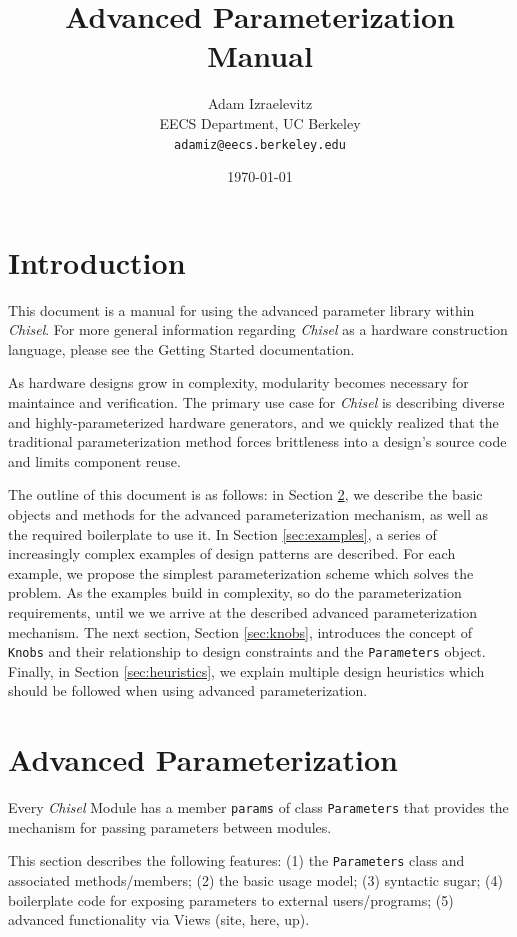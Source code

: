 \documentclass[10pt,twocolumn]{article}
\title{Advanced Parameterization Manual}
\author{Adam Izraelevitz \\
EECS Department, UC Berkeley\\
{\tt  adamiz@eecs.berkeley.edu}
}
\date{\today}
\def\code#1{{\small\tt #1}}
\begin{document}
\maketitle{}


\section{Introduction}

This document is a manual for using the advanced parameter library within {\em Chisel}. For more general information regarding {\em Chisel} as a hardware construction language, please see the Getting Started documentation.

As hardware designs grow in complexity, modularity becomes necessary for maintaince and verification. The primary use case for {\em Chisel} is describing diverse and highly-parameterized hardware generators, and we quickly realized that the traditional parameterization method forces brittleness into a design's source code and limits component reuse.

The outline of this document is as follows: in Section \ref{sec:advanced}, we describe the basic objects and methods for the advanced parameterization mechanism, as well as the required boilerplate to use it. In Section \ref{sec:examples}, a series of increasingly complex examples of design patterns are described. For each example, we propose the simplest parameterization scheme which solves the problem. As the examples build in complexity, so do the parameterization requirements, until we we arrive at the described advanced parameterization mechanism. The next section, Section \ref{sec:knobs}, introduces the concept of \code{Knobs} and their relationship to design constraints and the \code{Parameters} object. Finally, in Section \ref{sec:heuristics}, we explain multiple design heuristics which should be followed when using advanced parameterization.

\section{Advanced Parameterization}
\label{sec:advanced}
	
Every {\em Chisel} Module has a member \code{params} of class \code{Parameters} that provides the mechanism for passing parameters between modules.

This section describes the following features: (1) the \code{Parameters} class and associated methods/members; (2) the basic usage model; (3) syntactic sugar; (4) boilerplate code for exposing parameters to external users/programs; (5) advanced functionality via Views (site, here, up).
\end{document}
